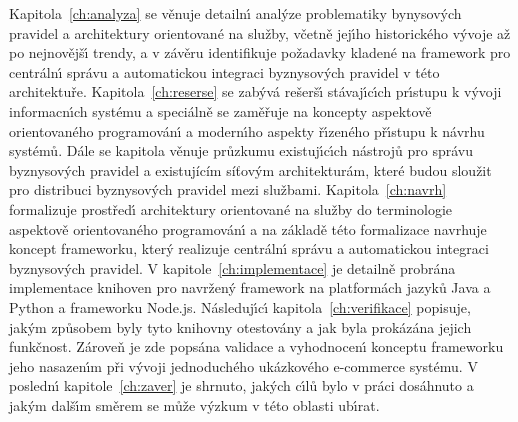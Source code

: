 Kapitola~\ref{ch:analyza} se věnuje detailn\'{\i} anal\'yze problematiky bynysov\'ych pravidel a
architektury orientované na služby, včetně jej\'{\i}ho historického v\'yvoje až po nejnovějš\'{\i} trendy,
a v závěru identifikuje požadavky kladené na framework pro centráln\'{\i} správu a
automatickou integraci byznysov\'ych pravidel v této architektuře. Kapitola~\ref{ch:reserse}
se zab\'yvá rešerš\'{\i} stávaj\'{\i}c\'{\i}ch pr\'{\i}stupu k v\'yvoji informacn\'{\i}ch systému a speciálně se zaměřuje
na koncepty aspektově orientovaného programován\'{\i} a modern\'{\i}ho aspekty ř\'{\i}zeného př\'{\i}stupu k návrhu
systémů. Dále se kapitola věnuje průzkumu existuj\'{\i}c\'{\i}ch nástrojů pro správu byznysov\'ych pravidel a existujícím
síťovým architekturám, které budou sloužit pro distribuci byznysových pravidel mezi službami.
Kapitola~\ref{ch:navrh} formalizuje prostřed\'{\i} architektury orientované na služby do terminologie
aspektově orientovaného programován\'{\i} a na základě této formalizace navrhuje koncept frameworku,
kter\'y realizuje centráln\'{\i} správu a automatickou integraci byznysov\'ych pravidel.
V kapitole~\ref{ch:implementace} je detailně probrána implementace knihoven pro navržen\'y framework
na platformách jazyků Java a Python a frameworku Node.js. Následuj\'{\i}c\'{\i} kapitola~\ref{ch:verifikace}
popisuje, jak\'ym způsobem byly tyto knihovny otestovány a jak byla prokázána jejich funkčnost. Zároveň
je zde popsána validace a vyhodnocen\'{\i} konceptu frameworku jeho nasazen\'{\i}m při v\'yvoji
jednoduchého ukázkového e-commerce systému. V posledn\'{\i} kapitole~\ref{ch:zaver} je shrnuto, jak\'ych
c\'{\i}lů bylo v práci dosáhnuto a jak\'ym dalš\'{\i}m směrem se může v\'yzkum v této oblasti ub\'{\i}rat.
